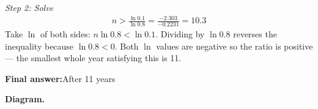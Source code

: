 \documentclass[11pt]{article}
\begin{document}
\textit{Step 2: Solve}
\[\begin{gathered}
n > \frac{\ln 0.1}{\ln 0.8} = \frac{-2.303}{-0.2231} = 10.3
\end{gathered}\]
Take \( \ln \) of both sides: \( n \ln 0.8 < \ln 0.1 \). Dividing by \( \ln 0.8 \) reverses the inequality because \( \ln 0.8 < 0 \). Both \( \ln \) values are negative so the ratio is positive --- the smallest whole year satisfying this is 11.

\begin{answerbox}
\textbf{Final answer:}\quad After 11 years
\end{answerbox}
\textbf{Diagram.}

\begin{center}
\end{center}
\end{document}

